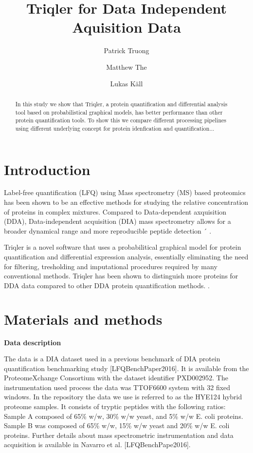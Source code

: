\documentclass[10pt,letterpaper]{article}
\title{Triqler for Data Independent Aquisition Data}
\author{Patrick Truong \and Matthew The \and Lukas K\"{a}ll}
\begin{document}
\maketitle

\begin{abstract}
  In this study we show that Triqler, a protein quantification and differential analysis tool based on probabilistical graphical models, has better performance than other protein quantification tools. To show this we compare different processing pipelines using different underlying concept for protein idenfication and quantification... 
\end{abstract}
  

\section*{Introduction}
Label-free quantification (LFQ) using Mass spectrometry (MS) based proteomics has been shown to be an effective methods for studying the relative concentration of proteins in complex mixtures. Compared to Data-dependent axquisition (DDA), Data-independent acquisition (DIA) mass spectrometry allows for a broader dynamical range and more reproducible peptide detection 
´ \citep{zhang2020DIA, Lu2021DIAmeter}.  
 
Triqler is a novel software that uses a probabilitical graphical model for protein quantification and differential expression analysis, essentially eliminating the need for filtering, tresholding and imputational procedures required by many conventional methods. Triqler has been shown to distinguish more proteins for DDA data compared to other DDA protein quantification methods. \citep{The2018Integrated}. 

 
\section*{Materials and methods}
\textbf{Data description}

The data is a DIA dataset used in a previous benchmark of DIA protein quantification benchmarking study [LFQBenchPaper2016]. It is available from the ProteomeXchange Consortium with the dataset identifier PXD002952. The instrumentation used process the data was TTOF6600 system with 32 fixed windows. In the repository the data we use is referred to as the HYE124 hybrid proteome samples. It consists of tryptic peptides with the following ratios: Sample A composed of 65\% w/w, 30\% w/w yeast, and 5\% w/w E. coli proteins. Sample B was composed of 65\% w/w, 15\% w/w yeast and 20\% w/w E. coli proteins. Further details about mass spectrometric instrumentation and data acquisition is available in Navarro et al. [LFQBenchPape2016].     
\end{document}
